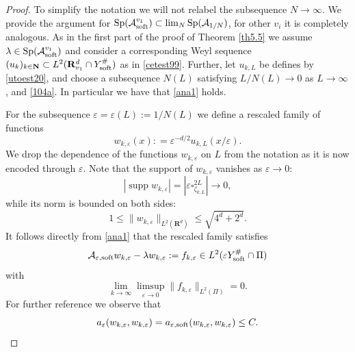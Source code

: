 \documentclass[11pt]{article}
\newcommand\e {\varepsilon}
\newcommand\soft{{\rm soft}}
\def\AA{\mathcal{A}}
\DeclareMathOperator{\Sp}{Sp}
\newcommand\supp{\mathop{\operatorname{supp}}}
\theoremstyle{remark}
\begin{document}
 		
	\begin{proof}
	To simplify the notation we will not relabel the subsequence $N\to \infty$. We  provide the argument for $\Sp(\AA_\soft ^{v_1})\subset \lim_{N} \Sp(\AA_{1/{N}})$, for other $v_i$  it is completely analogous.
	As in the first part of the proof of Theorem \ref{th5.5} we assume
 $\lambda \in \Sp  (\AA_\soft ^{v_1})$ and  consider a corresponding Weyl sequence
	  $(u_k)_{k \in \mathbf{N}} \subset L^2(\mathbf{R}^d_{v_1} \cap Y_\soft^{\#})$ as in \eqref{cetest99}. Further, let  $u_{k,L}$ be defines by \eqref{utoest20}, and choose a subsequence $N(L)$ satisfying $L/N(L) \to 0$ as $L\to \infty$, and \eqref{104a}.  In particular we have that  \eqref{ana1} holds.
	
	   For the subsequence $\e = \e(L):= 1/N(L)$ we define a rescaled family of functions
	\begin{equation*}
		w_{k,\e}(x): = \e^{-d/2}  u_{k,L} (x/\e).
	\end{equation*}
	We drop the dependence of the functions $w_{k,\e}$ on $L$ from the notation as it is now encoded  through $\e$.
	Note that the support of $w_{k,\e}$ vanishes as $\e\to 0$:
	\begin{equation*}%
		|\supp w_{k,\e}| = |\e\square_{\zeta_{k,L}}^{2L}| \to 0,
	\end{equation*}
	while its norm is bounded on both sides:
	 \begin{equation} \label{sriest10}
	  	1 \leq \|w_{k,\e}\|_{L^2(\mathbf{R}^d)} \leq \sqrt{4^d+2^d}.
	  \end{equation}
It follows directly from \eqref{ana1} that the rescaled family satisfies
	\begin{equation*} %
		\mathcal{A}_{\e,\soft} w_{k,\e} -\lambda w_{k,\e} := f_{k,\e} \in L^2(\e Y_\soft^\# \cap \Pi)
\end{equation*} 	
with
\begin{equation*}
	\lim_{k \to \infty}  \limsup_{\e \to 0}\|f_{k,\e}\|_{L^2(\Pi)}=0.
\end{equation*} 	
For further reference we observe that
\begin{equation}\label{124}
	a_\e(w_{k,\e},w_{k,\e}) = a_{\e,\soft}(w_{k,\e},w_{k,\e}) \leq C.
\end{equation}
	

\end{proof}
\end{document}
